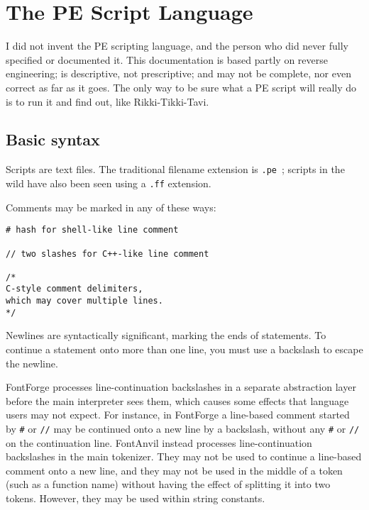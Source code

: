 \chapter{The PE Script Language}

\begin{framed}
I did not invent the PE scripting language, and the person who did never
fully specified or documented it.  This documentation is based partly on
reverse engineering; is descriptive, not prescriptive; and may not be
complete, nor even correct as far as it goes.  The only way to be sure
what a PE script will really do is to run it and find out, like
Rikki-Tikki-Tavi.
\end{framed}

\section{Basic syntax}

Scripts are text files.  The traditional filename extension is \texttt{.pe}~;
scripts in the wild have also been seen using a \texttt{.ff} extension.

Comments may be marked in any of these ways:
\begin{verbatim}
# hash for shell-like line comment

// two slashes for C++-like line comment

/*
C-style comment delimiters,
which may cover multiple lines.
*/
\end{verbatim}

\begin{framed}
Newlines are syntactically significant, marking the ends of
statements.
To continue a statement onto more than one line, you must use a backslash to
escape the newline.  
\end{framed}

FontForge \FFdiff processes line-continuation backslashes in a separate
abstraction layer before the main interpreter sees them, which causes some
effects that language users may not expect.  For instance, in FontForge a
line-based comment started by \texttt{\#} or \texttt{//} may be continued
onto a new line by a backslash, without any \texttt{\#} or \texttt{//} on
the continuation line.  FontAnvil instead processes
line-continuation backslashes in the main tokenizer.  They may not be used
to continue a line-based comment onto a new line, and they may not be used
in the middle of a token (such as a function name) without having the effect
of splitting it into two tokens.  However, they may be used within string
constants.

